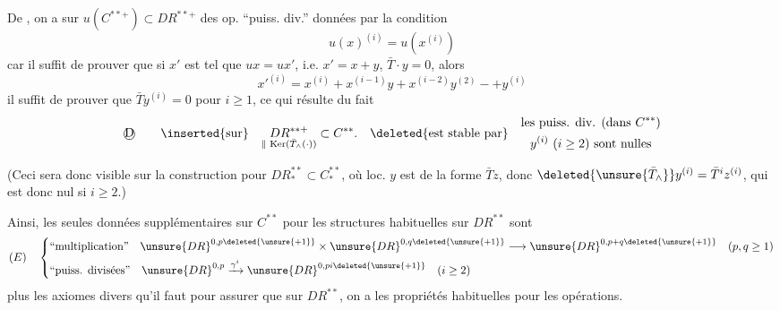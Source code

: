 De , on a sur $u(C^{**+})\subset DR^{**+}$ des op.
``puiss. div.''  données par la condition
\[
u(x)^{(i)}=u(x^{(i)})
\]
car il suffit de prouver que si $x'$ est tel que
$ux=ux'$, i.e. $x'=x+y$, $\bar T\cdot y=0$, alors
\[
x'^{(i)}=x^{(i)}+x^{(i-1)}y+x^{(i-2)}y^{(2)}-+y^{(i)}
\]
il suffit de prouver que $\bar T y^{(i)}=0$ pour $i\geq1$,
ce qui résulte du fait 
\[
\text{\textcircled{D}}\qquad
\inserted{\text{sur}}\quad
\underset{\Vert\,\operatorname{Ker}(\bar T_\wedge(\cdot))}{DR^{**+}}\subset C^{**}.
\quad\deleted{\text{est stable par}}
\quad\begin{gathered}
\text{les puiss. div. (dans }C^{**}\text{)}\\
y^{(i)}\ (i\geq2)\ \text{sont nulles}
\end{gathered}
\]

(Ceci sera donc visible sur la construction pour $DR_*^{**}\subset C_*^{**}$,
où loc. $y$ est de la forme $\bar Tz$, donc
$\deleted{\unsure{\bar T_\wedge}}y^{(i)}=\bar T^i z^{(i)}$,
qui est donc nul si $i\geq2$.)


Ainsi, les seules données supplémentaires sur $C^{**}$ pour
 les structures habituelles sur $DR^{**}$ sont
\[
(E)\quad\left\{\begin{aligned}
&\text{``multiplication''}\quad
\unsure{DR}^{0,p\deleted{\unsure{+1}}}\times
\unsure{DR}^{0,q\deleted{\unsure{+1}}}\longrightarrow
\unsure{DR}^{0,p+q\deleted{\unsure{+1}}}
\quad(p,q\geq1)\\
&\text{``puiss. divisées''}\quad
\unsure{DR}^{0,p}\xrightarrow{\gamma^i}
\unsure{DR}^{0,pi\deleted{\unsure{+1}}}
\quad(i\geq2)
\end{aligned}\right.
\]
plus les axiomes divers qu'il faut pour assurer que sur $DR^{**}$, on a les propriétés habituelles pour les opérations.
